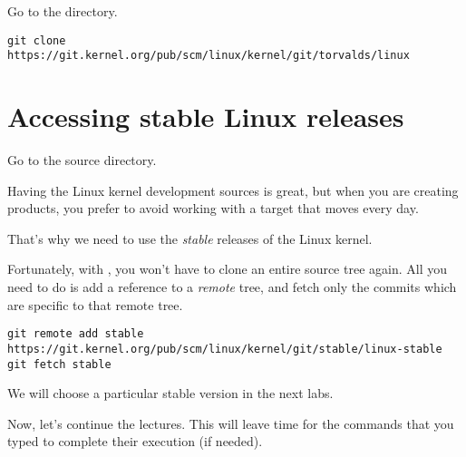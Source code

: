 Go to the  directory.

\begin{verbatim}
git clone https://git.kernel.org/pub/scm/linux/kernel/git/torvalds/linux
\end{verbatim}

\section{Accessing stable Linux releases}

Go to the  source directory.

Having the Linux kernel development sources is great, but when you are
creating products, you prefer to avoid working with a target that moves
every day.

That's why we need to use the {\em stable} releases of the Linux
kernel.

Fortunately, with , you won't have to clone an entire source
tree again. All you need to do is add a reference to a {\em remote}
tree, and fetch only the commits which are specific to that remote tree.

{\small
\begin{verbatim}
git remote add stable https://git.kernel.org/pub/scm/linux/kernel/git/stable/linux-stable
git fetch stable
\end{verbatim}
}

We will choose a particular stable version in the next labs.

Now, let's continue the lectures. This will leave time for the commands
that you typed to complete their execution (if needed).
